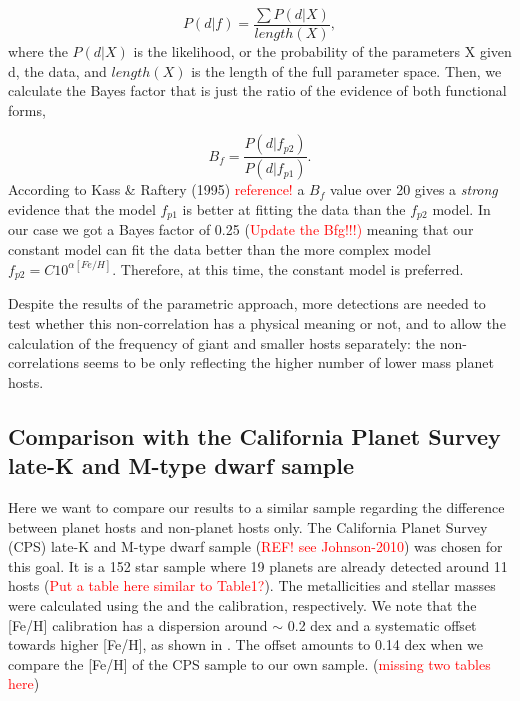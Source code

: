 \documentclass[structabstract]{aa}
\begin{document}
\begin{equation}
P(d|f) = \frac{\sum{P(d|X)}}{length(X)},
\end{equation}
where the $P(d|X)$ is the likelihood, or the probability of the parameters X given d, the data, and $length(X)$ is the length of the full parameter space. Then, we calculate the Bayes factor that is just the ratio of the evidence of both functional forms, 

\begin{equation}
B_{f} = \frac{P(d|f_{p2})}{P(d|f_{p1})}.
\end{equation}
According to Kass \& Raftery (1995) \textcolor{red}{reference!} a $B_{f}$ value over 20 gives a \textit{strong} evidence that the model $f_{p1}$ is better at fitting the data than the $f_{p2}$ model. In our case we got a Bayes factor of 0.25 (\textcolor{red}{Update the Bfg!!!)} meaning that our constant model can fit the data better than the more complex model $f_{p2} = C10^{\alpha[Fe/H]}$. Therefore, at this time, the constant model is preferred.

Despite the results of the parametric approach, more detections are needed to test whether this non-correlation has a physical meaning or not, and to allow the calculation of the frequency of giant and smaller hosts separately: the non-correlations seems to be only reflecting the higher number of lower mass planet hosts.

\subsection{Comparison with the California Planet Survey late-K and M-type dwarf sample}

Here we want to compare our results to a similar sample regarding the difference between planet hosts and non-planet hosts only. The California Planet Survey (CPS) late-K and M-type dwarf sample (\textcolor{red}{REF! see Johnson-2010}) was chosen for this goal. It is a 152 star sample where 19 planets are already detected around 11 hosts (\textcolor{red}{Put a table here similar to Table1?}). The metallicities and stellar masses were calculated using the \citet{Johnson-2009} and the \citet{Delfosse-2000} calibration, respectively. We note that the \citet{Johnson-2009} [Fe/H] calibration has a dispersion around $\sim$ 0.2 dex and a systematic offset towards higher [Fe/H], as shown in \citet{Neves-2012}. The offset amounts to 0.14 dex when we compare the [Fe/H] of the CPS sample to our own sample. (\textcolor{red}{missing two tables here})
\end{document}
